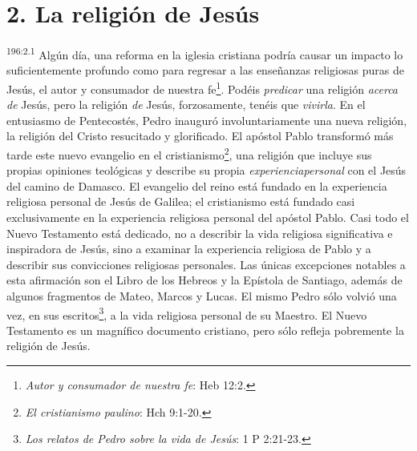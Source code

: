 \section*{2. La religión de Jesús}
\par
\textsuperscript{196:2.1} Algún día, una reforma en la iglesia cristiana podría causar un impacto lo suficientemente profundo como para regresar a las enseñanzas religiosas puras de Jesús, el autor y consumador de nuestra fe\footnote{\textit{Autor y consumador de nuestra fe}: Heb 12:2.}. Podéis \textit{predicar} una religión \textit{acerca de} Jesús, pero la religión \textit{de} Jesús, forzosamente, tenéis que \textit{vivirla}. En el entusiasmo de Pentecostés, Pedro inauguró involuntariamente una nueva religión, la religión del Cristo resucitado y glorificado. El apóstol Pablo transformó más tarde este nuevo evangelio en el cristianismo\footnote{\textit{El cristianismo paulino}: Hch 9:1-20.}, una religión que incluye sus propias opiniones teológicas y describe su propia \textit{experienciapersonal} con el Jesús del camino de Damasco. El evangelio del reino está fundado en la experiencia religiosa personal de Jesús de Galilea; el cristianismo está fundado casi exclusivamente en la experiencia religiosa personal del apóstol Pablo. Casi todo el Nuevo Testamento está dedicado, no a describir la vida religiosa significativa e inspiradora de Jesús, sino a examinar la experiencia religiosa de Pablo y a describir sus convicciones religiosas personales. Las únicas excepciones notables a esta afirmación son el Libro de los Hebreos y la Epístola de Santiago, además de algunos fragmentos de Mateo, Marcos y Lucas. El mismo Pedro sólo volvió una vez, en sus escritos\footnote{\textit{Los relatos de Pedro sobre la vida de Jesús}: 1 P 2:21-23.}, a la vida religiosa personal de su Maestro. El Nuevo Testamento es un magnífico documento cristiano, pero sólo refleja pobremente la religión de Jesús.

